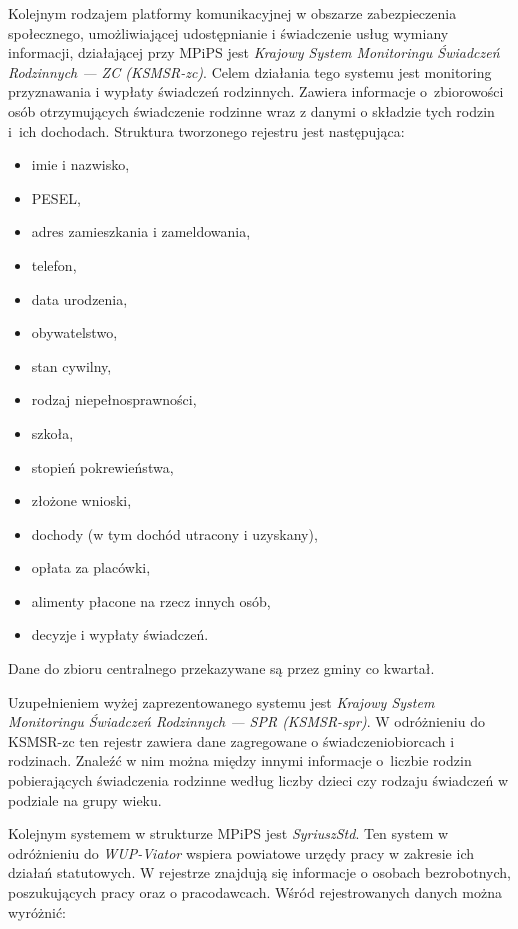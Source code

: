 Kolejnym rodzajem platformy komunikacyjnej w obszarze zabezpieczenia społecznego, umożliwiającej udostępnianie i świadczenie usług wymiany informacji, działającej przy MPiPS jest \textit{Krajowy System Monitoringu Świadczeń Rodzinnych --- ZC (KSMSR-zc)}. Celem działania tego systemu jest monitoring przyznawania i wypłaty świadczeń rodzinnych. Zawiera informacje o~zbiorowości osób otrzymujących świadczenie rodzinne wraz z danymi o składzie tych rodzin i~ich dochodach. Struktura tworzonego rejestru jest następująca:

\begin{itemize}
\item imie i nazwisko,
\item PESEL,
\item adres zamieszkania i zameldowania,
\item telefon, 
\item data urodzenia,
\item obywatelstwo,
\item stan cywilny,
\item rodzaj niepełnosprawności,
\item szkoła,
\item stopień pokrewieństwa,
\item złożone wnioski,
\item dochody (w tym dochód utracony i uzyskany),
\item opłata za placówki,
\item alimenty płacone na rzecz innych osób,
\item decyzje i wypłaty świadczeń.
\end{itemize}

Dane do zbioru centralnego przekazywane są przez gminy co kwartał.

Uzupełnieniem wyżej zaprezentowanego systemu jest \textit{Krajowy System Monitoringu Świadczeń Rodzinnych --- SPR (KSMSR-spr)}. W odróżnieniu do KSMSR-zc ten rejestr zawiera dane zagregowane o świadczeniobiorcach i rodzinach. Znaleźć w nim można między innymi informacje o~liczbie rodzin pobierających świadczenia rodzinne według liczby dzieci czy rodzaju świadczeń w podziale na grupy wieku. 

Kolejnym systemem w strukturze MPiPS jest \textit{SyriuszStd}. Ten system w odróżnieniu do \textit{WUP-Viator} wspiera powiatowe urzędy pracy w zakresie ich działań statutowych. W rejestrze znajdują się informacje o osobach bezrobotnych, poszukujących pracy oraz o pracodawcach. Wśród rejestrowanych danych można wyróżnić:

